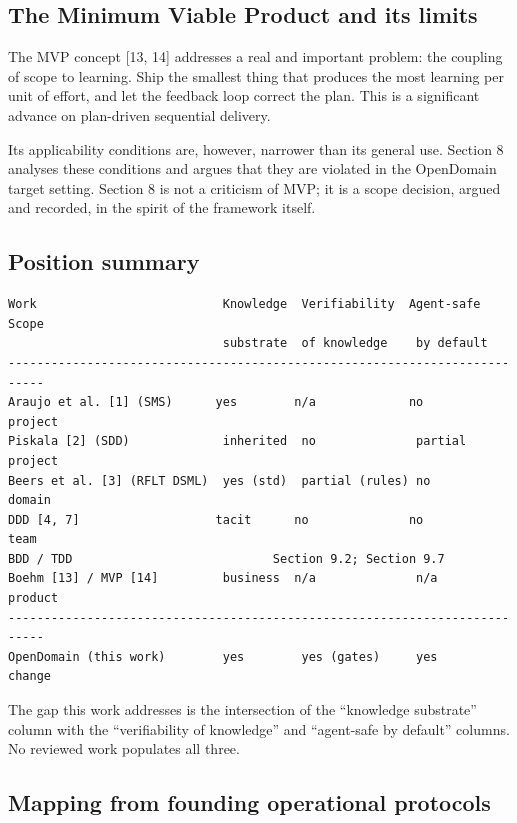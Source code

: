 \documentclass[11pt,a4paper]{article}
\begin{document}
\subsection{The Minimum Viable Product and its limits}

The MVP concept [13, 14] addresses a real and important problem: the coupling of scope to learning. Ship the smallest thing that produces the most learning per unit of effort, and let the feedback loop correct the plan. This is a significant advance on plan-driven sequential delivery.

Its applicability conditions are, however, narrower than its general use. Section 8 analyses these conditions and argues that they are violated in the OpenDomain target setting. Section 8 is not a criticism of MVP; it is a scope decision, argued and recorded, in the spirit of the framework itself.

\subsection{Position summary}

\begin{Verbatim}[fontsize=\footnotesize,breaklines=true,breakanywhere=true,breakautoindent=false,samepage=false]
Work                          Knowledge  Verifiability  Agent-safe  Scope
                              substrate  of knowledge    by default
---------------------------------------------------------------------------
Araujo et al. [1] (SMS)      yes        n/a             no         project
Piskala [2] (SDD)             inherited  no              partial    project
Beers et al. [3] (RFLT DSML)  yes (std)  partial (rules) no         domain
DDD [4, 7]                   tacit      no              no         team
BDD / TDD                            Section 9.2; Section 9.7
Boehm [13] / MVP [14]         business  n/a              n/a         product
---------------------------------------------------------------------------
OpenDomain (this work)        yes        yes (gates)     yes         change
\end{Verbatim}

The gap this work addresses is the intersection of the ``knowledge substrate'' column with the ``verifiability of knowledge'' and ``agent-safe by default'' columns. No reviewed work populates all three.

\subsection{Mapping from founding operational protocols}
\end{document}
